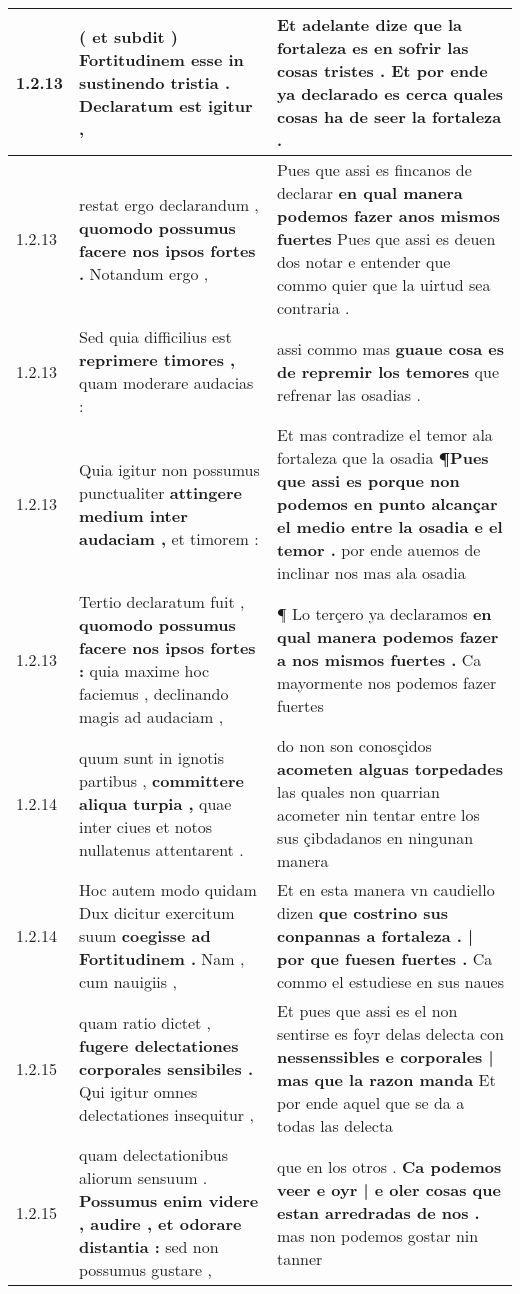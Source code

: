 \begin{tabular}{|p{1cm}|p{6.5cm}|p{6.5cm}|}
1.2.13 & ( et subdit ) \textbf{ Fortitudinem esse in sustinendo tristia . } Declaratum est igitur , & Et adelante dize \textbf{ que la fortaleza es en sofrir las cosas tristes . } Et por ende ya declarado es cerca quales cosas ha de seer la fortaleza . \\\hline
1.2.13 & restat ergo declarandum , \textbf{ quomodo possumus facere nos ipsos fortes . } Notandum ergo , & Pues que assi es fincanos de declarar \textbf{ en qual manera podemos fazer anos mismos fuertes } Pues que assi es deuen dos notar e entender que commo quier que la uirtud sea contraria . \\\hline
1.2.13 & Sed quia difficilius est \textbf{ reprimere timores , } quam moderare audacias : & assi commo mas \textbf{ guaue cosa es de repremir los temores } que refrenar las osadias . \\\hline
1.2.13 & Quia igitur non possumus punctualiter \textbf{ attingere medium inter audaciam , } et timorem : & Et mas contradize el temor ala fortaleza que la osadia \textbf{ ¶Pues que assi es porque non podemos en punto alcançar el medio entre la osadia e el temor . } por ende auemos de inclinar nos mas ala osadia \\\hline
1.2.13 & Tertio declaratum fuit , \textbf{ quomodo possumus facere nos ipsos fortes : } quia maxime hoc faciemus , declinando magis ad audaciam , & ¶ Lo terçero ya declaramos \textbf{ en qual manera podemos fazer a nos mismos fuertes . } Ca mayormente nos podemos fazer fuertes \\\hline
1.2.14 & quum sunt in ignotis partibus , \textbf{ committere aliqua turpia , } quae inter ciues et notos nullatenus attentarent . & do non son conosçidos \textbf{ acometen alguas torpedades } las quales non quarrian acometer nin tentar entre los sus çibdadanos en ningunan manera \\\hline
1.2.14 & Hoc autem modo quidam Dux dicitur exercitum suum \textbf{ coegisse ad Fortitudinem . } Nam , cum nauigiis , & Et en esta manera vn caudiello dizen \textbf{ que costrino sus conpannas a fortaleza . | por que fuesen fuertes . } Ca commo el estudiese en sus naues \\\hline
1.2.15 & quam ratio dictet , \textbf{ fugere delectationes corporales sensibiles . } Qui igitur omnes delectationes insequitur , & Et pues que assi es el non sentirse es foyr delas delecta con \textbf{ nessenssibles e corporales | mas que la razon manda } Et por ende aquel que se da a todas las delecta \\\hline
1.2.15 & quam delectationibus aliorum sensuum . \textbf{ Possumus enim videre , audire , et odorare distantia : } sed non possumus gustare , & que en los otros . \textbf{ Ca podemos veer e oyr | e oler cosas que estan arredradas de nos . } mas non podemos gostar nin tanner \\\hline

\end{tabular}
